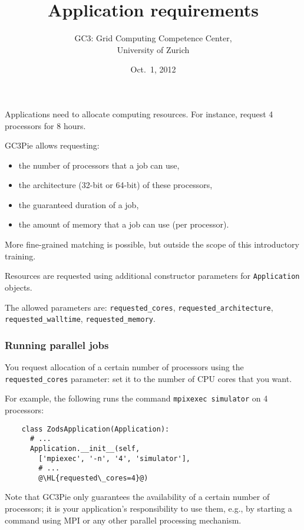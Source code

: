 \documentclass[english,serif,mathserif,xcolor=pdftex,dvipsnames,table]{beamer}
\title{%
  Application requirements
}
\author[Riccardo Murri]{%
  GC3: Grid Computing Competence Center, \\
  University of Zurich
}
\date{Oct.~1, 2012}
\begin{document}
\maketitle


\begin{frame}
  Applications need to allocate computing resources.
  For instance, request 4 processors for 8 hours.

  \+
  GC3Pie allows requesting:
  \begin{itemize}
  \item the number of processors that a job can use,
  \item the architecture (32-bit or 64-bit) of these processors,
  \item the guaranteed duration of a job,
  \item the amount of memory that a job can use (per processor).
  \end{itemize}

  \+ 
  More fine-grained matching is possible, but outside the scope of
  this introductory training.
\end{frame}


\begin{frame}
  Resources are requested using additional constructor parameters for
  \texttt{Application} objects.

  \+
  The allowed parameters are:
  \lstinline|requested_cores|,
  \lstinline|requested_architecture|,
  \lstinline|requested_walltime|,
  \lstinline|requested_memory|.
\end{frame}


\begin{frame}[fragile]
  \frametitle{Running parallel jobs}

  You request allocation of a certain number of processors using the
  \lstinline|requested_cores| parameter: set it to the number of CPU
  cores that you want.

  \+ 
  For example, the following runs the command \texttt{mpixexec
    simulator} on 4 processors:
  \begin{lstlisting}
    class ZodsApplication(Application):
      # ...
      Application.__init__(self,
        ['mpiexec', '-n', '4', 'simulator'],
        # ...
        @\HL{requested\_cores=4}@)
  \end{lstlisting}
  
  \+ 
  {\small Note that GC3Pie only guarantees the availability of a certain
    number of processors; it is your application's responsibility to use
    them, e.g., by starting a command using MPI or any other parallel
    processing mechanism.}
\end{frame}
\end{document}

